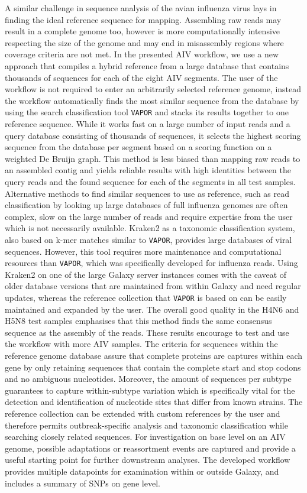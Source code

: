 A similar challenge in sequence analysis of the avian influenza virus lays in finding the ideal reference sequence for mapping. Assembling raw reads may result in a complete genome too, however is more computationally intensive respecting the size of the genome and may end in misassembly regions where coverage criteria are not met. In the presented \ac{AIV} workflow, we use a new approach that compiles a hybrid reference from a large database that contains thousands of sequences for each of the eight \ac{AIV} segments. The user of the workflow is not required to enter an arbitrarily selected reference genome, instead the workflow automatically finds the most similar sequence from the database by using the search classification tool \texttt{VAPOR} and stacks its results together to one reference sequence. While it works fast on a large number of input reads and a query database consisting of thousands of sequences, it selects the highest scoring sequence from the database per segment based on a scoring function on a weighted De Bruijn graph. This method is less biased than mapping raw reads to an assembled contig and yields reliable results with high identities between the query reads and the found sequence for each of the segments in all test samples. Alternative methods to find similar sequences to use as reference, such as read classification by looking up large databases of full influenza genomes are often complex, slow on the large number of reads and require expertise from the user which is not necessarily available. Kraken2 as a taxonomic classification system, also based on k-mer matches similar to \texttt{VAPOR}, provides large databases of viral sequences. However, this tool requires more maintenance and computational resources than \texttt{VAPOR}, which was specifically developed for influenza reads. Using Kraken2 on one of the large Galaxy server instances comes with the caveat of older database versions that are maintained from within Galaxy and need regular updates, whereas the reference collection that \texttt{VAPOR} is based on can be easily maintained and expanded by the user. The overall good quality in the H4N6 and H5N8 test samples emphasises that this method finds the same consensus sequence as the assembly of the reads. These results encourage to test and use the workflow with more \ac{AIV} samples. The criteria for sequences within the reference genome database assure that complete proteins are captures within each gene by only retaining sequences that contain the complete start and stop codons and no ambiguous nucleotides. Moreover, the amount of sequences per subtype guarantees to capture within-subtype variation which is specifically vital for the detection and identification of nucleotide sites that differ from known strains. The reference collection can be extended with custom references by the user and therefore permits outbreak-specific analysis and taxonomic classification while searching closely related sequences. For investigation on base level on an \ac{AIV} genome, possible adaptations or reassortment events are captured and provide a useful starting point for further downstream analyses. The developed workflow provides multiple datapoints for examination within or outside Galaxy, and includes a summary of \acp{SNP} on gene level. 